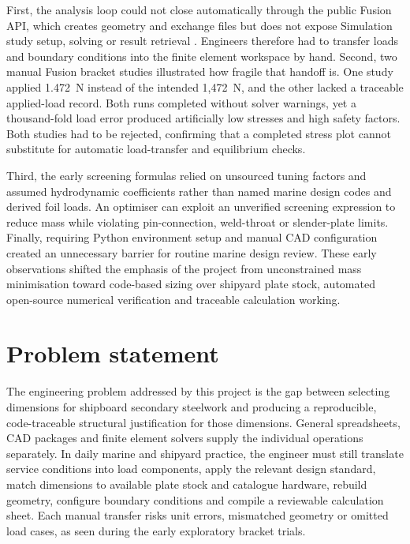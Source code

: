 First, the analysis loop could not close automatically through the public Fusion API, which creates geometry and exchange files but does not expose Simulation study setup, solving or result retrieval \cite{autodeskStaticStress,autodeskAddins}. Engineers therefore had to transfer loads and boundary conditions into the finite element workspace by hand. Second, two manual Fusion bracket studies illustrated how fragile that handoff is. One study applied 1.472~N instead of the intended 1,472~N, and the other lacked a traceable applied-load record. Both runs completed without solver warnings, yet a thousand-fold load error produced artificially low stresses and high safety factors. Both studies had to be rejected, confirming that a completed stress plot cannot substitute for automatic load-transfer and equilibrium checks.

Third, the early screening formulas relied on unsourced tuning factors and assumed hydrodynamic coefficients rather than named marine design codes and derived foil loads. An optimiser can exploit an unverified screening expression to reduce mass while violating pin-connection, weld-throat or slender-plate limits. Finally, requiring Python environment setup and manual CAD configuration created an unnecessary barrier for routine marine design review. These early observations shifted the emphasis of the project from unconstrained mass minimisation toward code-based sizing over shipyard plate stock, automated open-source numerical verification and traceable calculation working.

\section{Problem statement}
\label{sec:problem-statement}

The engineering problem addressed by this project is the gap between selecting dimensions for shipboard secondary steelwork and producing a reproducible, code-traceable structural justification for those dimensions. General spreadsheets, CAD packages and finite element solvers supply the individual operations separately. In daily marine and shipyard practice, the engineer must still translate service conditions into load components, apply the relevant design standard, match dimensions to available plate stock and catalogue hardware, rebuild geometry, configure boundary conditions and compile a reviewable calculation sheet. Each manual transfer risks unit errors, mismatched geometry or omitted load cases, as seen during the early exploratory bracket trials.

